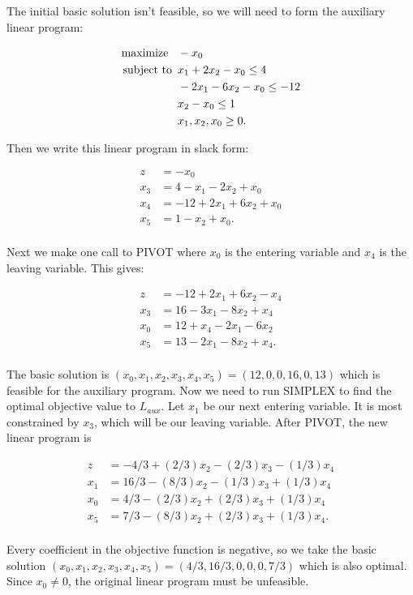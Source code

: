 \documentclass{article}
\begin{document}
The initial basic solution isn't feasible, so we will need to form the auxiliary linear program:

\begin{align*}
\mbox{maximize \,\,\,} & -x_0\\
\mbox{subject to \,} &x_1 + 2x_2 - x_0 \leq 4 \\
& -2x_1 - 6x_2 - x_0 \leq -12\\
& x_2 - x_0 \leq 1 \\
& x_1,x_2,x_0 \geq 0.
\end{align*}

Then we write this linear program in slack form:

\begin{align*}
z &= -x_0\\
x_3 &= 4 - x_1 - 2x_2 + x_0  \\
x_4 &= -12 + 2x_1 + 6x_2 + x_0 \\
x_5 &= 1 - x_2 + x_0. \\
\end{align*}

Next we make one call to PIVOT where $x_0$ is the entering variable and $x_4$ is the leaving variable. This gives:

\begin{align*}
z &= -12 + 2x_1 + 6x_2 - x_4\\
x_3 &= 16 - 3x_1 - 8x_2 + x_4  \\
x_0 &= 12 + x_4 - 2x_1 - 6x_2 \\
x_5 &= 13 - 2x_1 - 8x_2 + x_4. \\
\end{align*}

The basic solution is $(x_0,x_1,x_2,x_3,x_4,x_5) = (12, 0,0,16,0,13)$ which is feasible for the auxiliary program.  Now we need to run SIMPLEX to find the optimal objective value to $L_{aux}$.  Let $x_1$ be our next entering variable.  It is most constrained by $x_3$, which will be our leaving variable.  After PIVOT, the new linear program is

\begin{align*}
z &= -4/3 + (2/3)x_2 - (2/3)x_3 - (1/3)x_4 \\
x_1 &= 16/3 - (8/3)x_2 - (1/3)x_3 + (1/3)x_4  \\
x_0 &= 4/3 - (2/3)x_2 + (2/3)x_3 + (1/3)x_4 \\
x_5 &= 7/3 - (8/3)x_2 + (2/3)x_3 + (1/3)x_4. \\
\end{align*}

Every coefficient in the objective function is negative, so we take the basic solution $(x_0,x_1,x_2,x_3,x_4,x_5) = (4/3, 16/3, 0,0,0,7/3)$ which is also optimal.  Since $x_0 \neq 0$, the original linear program must be unfeasible. \\
\end{document}
